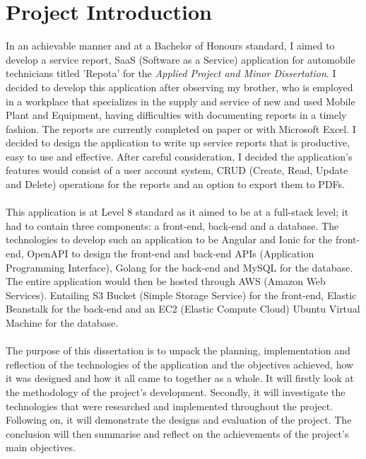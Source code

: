 \section{Project Introduction}
In an achievable manner and at a Bachelor of Honours standard, I aimed to develop a service report, SaaS (Software as a Service) application for automobile technicians titled 'Repota' for the \textit{Applied Project and Minor Dissertation}. I decided to develop this application after observing my brother, who is employed in a workplace that specializes in the supply and service of new and used Mobile Plant and Equipment, having difficulties with documenting reports in a timely fashion. The reports are currently completed on paper or with Microsoft Excel. I decided to design the application to write up service reports that is productive, easy to use and effective. After careful consideration, I decided the application's features would consist of a user account system, CRUD (Create, Read, Update and Delete) operations for the reports and an option to export them to PDFs.
\\\\ This application is at Level 8 standard as it aimed to be at a full-stack level; it had to contain three components: a front-end, back-end and a database. The technologies to develop such an application to be Angular and Ionic for the front-end, OpenAPI to design the front-end and back-end APIs (Application Programming Interface), Golang for the back-end and MySQL for the database. The entire application would then be hosted through AWS (Amazon Web Services). Entailing S3 Bucket (Simple Storage Service) for the front-end, Elastic Beanstalk for the back-end and an EC2 (Elastic Compute Cloud) Ubuntu Virtual Machine for the database.
\\\\ The purpose of this dissertation is to unpack the planning, implementation and reflection of the technologies of the application and the objectives achieved, how it was designed and how it all came to together as a whole. It will firstly look at the methodology of the project's development. Secondly, it will investigate the technologies that were researched and implemented throughout the project. Following on, it will demonstrate the designs and evaluation of the project. The conclusion will then summarise and reflect on the achievements of the project's main objectives.

